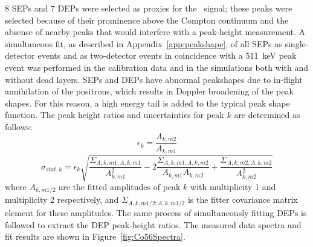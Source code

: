 \documentclass[/main.tex]{subfiles}
\begin{document}
8 SEPs and 7 DEPs were selected as proxies for the \bbes\ signal; these peaks were selected because of their prominence above the Compton continuum and the absense of nearby peaks that would interfere with a peak-height measurement.
A simultaneous fit, as described in Appendix~\ref{app:peakshape}, of all SEPs as single-detector events and as two-detector events in coincidence with a 511~keV peak event was performed in the calibration data and in the simulations both with and without dead layers.
SEPs and DEPs have abnormal peakshapes due to in-flight annihilation of the positrons, which results in Doppler broadening of the peak shapes.
For this reason, a high energy tail is added to the typical peak shape function.
The peak height ratios and uncertainties for peak $k$ are determined as follows:
\begin{equation}
  \epsilon_k=\frac{A_{k,m2}}{A_{k,m1}}
\end{equation}
\begin{equation}
  \sigma_{stat, k}=\epsilon_k \sqrt{\frac{\Sigma_{A,k,m1;A,k,m1}}{A_{k,m1}^2}-2\frac{\Sigma_{A,k,m1;A,k,m2}}{A_{k,m1}A_{k,m2}}+\frac{\Sigma_{A,k,m2;A,k,m2}}{A_{k,m2}^2}}
\end{equation}
where $A_{k,m1/2}$ are the fitted amplitudes of peak $k$ with multiplicity 1 and multiplicity 2 respectively, and $\Sigma_{A,k,m1/2;A,k,m1/2}$ is the fitter covariance matrix element for these amplitudes.
The same process of simultaneously fitting DEPs is followed to extract the DEP peak-height ratios.
The measured data spectra and fit results are shown in Figure~\ref{fig:Co56Spectra}.
\end{document}
